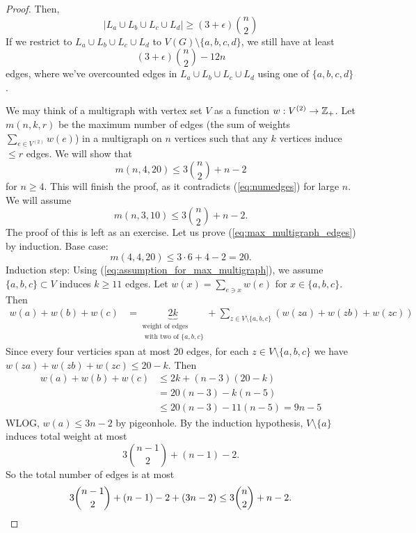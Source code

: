 \begin{proof}
Then,
\[
|L_a \cup L_b\cup L_c \cup L_d| \geq (3 + \epsilon) {n \choose 2}
\]
If we restrict to $L_a\cup L_b\cup L_c\cup L_d$ to $V(G)\setminus \{a,b,c,d\}$, we still have at least 
\begin{equation} \label{eq:numedges} \tag{$\star$f}
(3+ \epsilon){n\choose 2} - 12n
\end{equation}
 edges, where we've overcounted edges in $L_a\cup L_b\cup L_c\cup L_d$ using one of $\{a,b,c,d\}$.

We may think of a multigraph with vertex set $V$ as a function $w: V^{(2)} \to \mathbb{Z}_+$.
Let $m(n,k,r)$ be the maximum number of edges (the sum of weights $\sum_{e\in V^{(2)}} w(e)$) in a multigraph on $n$ vertices such that any $k$ vertices induce $\leq r$ edges.
We will show that 
\begin{equation} \label{eq:max_multigraph_edges} \tag{$\star$}
m(n,4,20) \leq 3 {n\choose 2} + n -2
\end{equation}
for $n\geq 4$. This will finish the proof, as it contradicts (\ref{eq:numedges}) for large $n$.
We will assume 
\begin{equation} \label{eq:assumption_for_max_multigraph} \tag{$\star\star$}
m(n,3,10) \leq 3 {n\choose 2} + n-2.
\end{equation}
The proof of this is left as an exercise.
Let us prove (\ref{eq:max_multigraph_edges}) by induction.
Base case: 
\[
m(4,4,20) \leq 3\cdot 6 + 4-2 = 20.
\]
Induction step: Using (\ref{eq:assumption_for_max_multigraph}), we assume $\{a,b,c\} \subset V$  induces $k\geq 11$ edges. Let $w(x)= \sum_{e\ni x} w(e)$ for $x\in \{a,b,c\}$.
Then
\begin{align*}	
w(a) +w(b) + w(c) &= \underbrace{2k}_{\substack{\text{weight of edges} \\ \text{ with two of $\{a,b,c\}$}}} + \sum_{z\in V\setminus \{a,b,c\}} ( w(za) + w(zb) + w(zc))
\end{align*}
 Since every four verticies span at most 20 edges, for each $z\in V\setminus \{a,b,c\}$ we have $w(za) +w(zb) + w(zc)  \leq 20-k$.  Then 
\begin{align*}
w(a) + w(b)+ w(c) &\leq
2k + (n-3) (20-k) \\
&= 20(n-3) - k(n-5)\\
&\leq 20 (n-3) - 11(n-5) = 9n-5
\end{align*}
WLOG, $w(a) \leq 3n-2$ by pigeonhole.
By the induction hypothesis, $V\setminus \{a\}$ induces total weight at most
\[
3 {n-1 \choose 2} + (n-1)-2.
\]
So the total number of edges is at most
\[
 3 {n-1 \choose 2} + (n-1)-2 + (3n-2) \leq 3 {n\choose 2} + n-2. \qedhere
\]
\end{proof}
